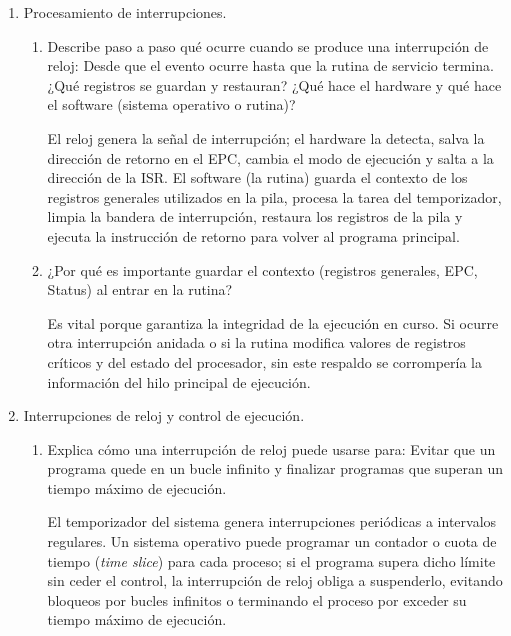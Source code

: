 \documentclass[12pt,a4paper]{article}
\begin{document}
\begin{enumerate}[label=\arabic*.]
    \item Procesamiento de interrupciones.
    
    \begin{enumerate}[label=\alph*)]
        \item Describe paso a paso qué ocurre cuando se produce una interrupción de reloj: Desde que el evento ocurre hasta que la rutina de servicio termina. ¿Qué registros se guardan y restauran? ¿Qué hace el hardware y qué hace el software (sistema operativo o rutina)?
        
        \vspace{0.3cm}
        \noindent
        El reloj genera la señal de interrupción; el hardware la detecta, salva la dirección de retorno en el EPC, cambia el modo de ejecución y salta a la dirección de la ISR. El software (la rutina) guarda el contexto de los registros generales utilizados en la pila, procesa la tarea del temporizador, limpia la bandera de interrupción, restaura los registros de la pila y ejecuta la instrucción de retorno para volver al programa principal.

        \item ¿Por qué es importante guardar el contexto (registros generales, EPC, Status) al entrar en la rutina?
        
        \vspace{0.3cm}
        \noindent
        Es vital porque garantiza la integridad de la ejecución en curso. Si ocurre otra interrupción anidada o si la rutina modifica valores de registros críticos y del estado del procesador, sin este respaldo se corrompería la información del hilo principal de ejecución.
    \end{enumerate}

    \item Interrupciones de reloj y control de ejecución.
    
    \begin{enumerate}[label=\alph*)]
        \item Explica cómo una interrupción de reloj puede usarse para: Evitar que un programa quede en un bucle infinito y finalizar programas que superan un tiempo máximo de ejecución.
        
        \vspace{0.3cm}
        \noindent
        El temporizador del sistema genera interrupciones periódicas a intervalos regulares. Un sistema operativo puede programar un contador o cuota de tiempo (\textit{time slice}) para cada proceso; si el programa supera dicho límite sin ceder el control, la interrupción de reloj obliga a suspenderlo, evitando bloqueos por bucles infinitos o terminando el proceso por exceder su tiempo máximo de ejecución.


\end{enumerate}
\end{enumerate}
\end{document}
